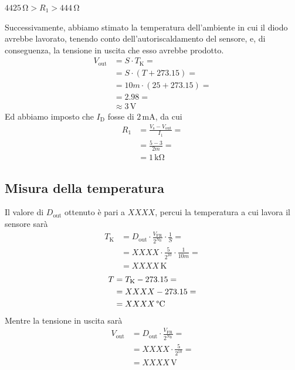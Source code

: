 \documentclass[a4paper]{article}
\begin{document}
			\begin{center}
				$ 4425 \, \mathrm{\Omega} > R_{1} > 444 \, \mathrm{\Omega} $
			\end{center}
			Successivamente, abbiamo stimato la temperatura dell'ambiente in cui il diodo avrebbe lavorato, tenendo conto dell'autoriscaldamento del sensore, e, di conseguenza, la tensione in uscita che esso avrebbe prodotto.
			\begin{equation*}
				\begin{split}
					V_{\mathrm{out}} &= S \cdot T_{\mathrm{K}} = \\
									 &= S \cdot (T + 273.15) = \\
									 &= 10m \cdot (25 + 273.15) = \\
									 &= 2.98 = \\
									 &\approx 3 \, \mathrm{V}
				\end{split}
			\end{equation*}
			Ed abbiamo imposto che $ I_{\mathrm{D}} $ fosse di $ 2 \, \mathrm{mA} $, da cui
			\begin{equation*}
				\begin{split}
					R_{1} &= \frac{V_{\mathrm{s}} - V_{\mathrm{out}}}{I_{1}} = \\
						  &= \frac{5 - 3}{2m} = \\
						  &= 1 \, \mathrm{k\Omega}
				\end{split}
			\end{equation*}
		\subsection{Misura della temperatura} 
			Il valore di $ D_{\mathrm{out}} $ ottenuto è pari a $ XXXX $, percui la temperatura a cui lavora il sensore sarà
			\begin{equation*}
				\begin{split}
					T_{\mathrm{K}} &= D_{\mathrm{out}} \cdot \frac{V_{\mathrm{FR}}}{2^{N_{\mathrm{B}}}} \cdot \frac{1}{S} = \\
								   &= XXXX \cdot \frac{5}{2^{10}} \cdot \frac{1}{10m} = \\
								   &= XXXX \, \mathrm{K}
				\end{split}
			\end{equation*}
			\begin{equation*}
				\begin{split}
					T &= T_{\mathrm{K}} - 273.15 = \\
					  &= XXXX - 273.15 = \\
					  &= XXXX \, \mathrm{\text{\textdegree} C}
				\end{split}
			\end{equation*}
			Mentre la tensione in uscita sarà
			\begin{equation*}
				\begin{split}
					V_{\mathrm{out}} &= D_{\mathrm{out}} \cdot \frac{V_{\mathrm{FR}}}{2^{N_{\mathrm{B}}}} = \\
									 &= XXXX \cdot \frac{5}{2^{10}} = \\
									 &= XXXX \, \mathrm{V}
				\end{split}
			\end{equation*}
\end{document}
